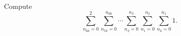 Compute \[\sum_{n_{60}=0}^2\sum_{n_{59}=0}^{n_{60}}\cdots\sum_{n_2=0}^{n_3}\sum_{n_1=0}^{n_2}\sum_{n_0=0}^{n_1}1.\]